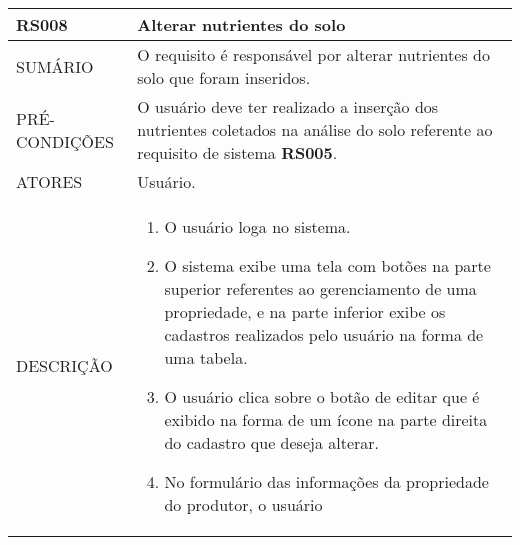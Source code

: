 \begin{longtable}[c]{@{}|p{4cm}|p{9cm}|@{}}
\hline
\begin{minipage}[t]{0.47\columnwidth}
\textbf{RS008}
\end{minipage} & \begin{minipage}[t]{0.47\columnwidth}
Alterar nutrientes do solo
\end{minipage}
\\\hline
\begin{minipage}[t]{0.47\columnwidth}
SUMÁRIO
\end{minipage} & \begin{minipage}[t]{0.47\columnwidth}
O requisito é responsável por alterar nutrientes do solo que foram
inseridos.
\end{minipage}
\\\hline
\begin{minipage}[t]{0.47\columnwidth}
PRÉ-CONDIÇÕES
\end{minipage} & \begin{minipage}[t]{0.47\columnwidth}
O usuário deve ter realizado a inserção dos nutrientes coletados na
análise do solo referente ao requisito de sistema \textbf{RS005}.
\end{minipage}
\\\hline
\begin{minipage}[t]{0.47\columnwidth}
ATORES
\end{minipage} & \begin{minipage}[t]{0.47\columnwidth}
Usuário.
\end{minipage}
\\\hline
\begin{minipage}[t]{0.47\columnwidth}
DESCRIÇÃO
\end{minipage} & \begin{minipage}[t]{0.47\columnwidth}
\begin{enumerate}
\def\labelenumi{\arabic{enumi}.}
\itemsep1pt\parskip0pt\parsep0pt
\item
  O usuário loga no sistema.
\item
  O sistema exibe uma tela com botões na parte superior referentes ao
  gerenciamento de uma propriedade, e na parte inferior exibe os
  cadastros realizados pelo usuário na forma de uma tabela.
\item
  O usuário clica sobre o botão de editar que é exibido na forma de um
  ícone na parte direita do cadastro que deseja alterar.
\item
  No formulário das informações da propriedade do produtor, o usuário

\end{enumerate}
\end{minipage}
\end{longtable}

